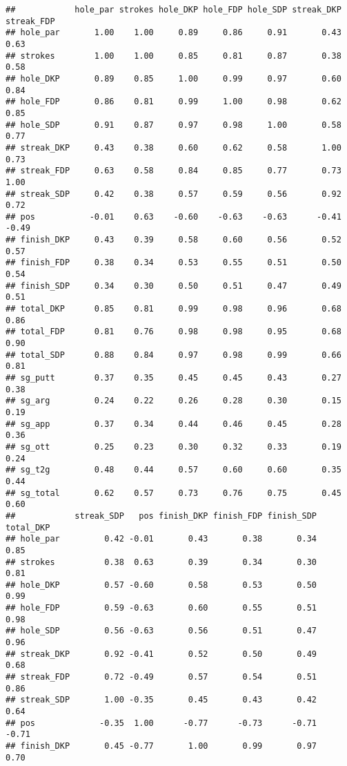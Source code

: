 \documentclass[
]{article}
\begin{document}
\begin{verbatim}
##            hole_par strokes hole_DKP hole_FDP hole_SDP streak_DKP streak_FDP
## hole_par       1.00    1.00     0.89     0.86     0.91       0.43       0.63
## strokes        1.00    1.00     0.85     0.81     0.87       0.38       0.58
## hole_DKP       0.89    0.85     1.00     0.99     0.97       0.60       0.84
## hole_FDP       0.86    0.81     0.99     1.00     0.98       0.62       0.85
## hole_SDP       0.91    0.87     0.97     0.98     1.00       0.58       0.77
## streak_DKP     0.43    0.38     0.60     0.62     0.58       1.00       0.73
## streak_FDP     0.63    0.58     0.84     0.85     0.77       0.73       1.00
## streak_SDP     0.42    0.38     0.57     0.59     0.56       0.92       0.72
## pos           -0.01    0.63    -0.60    -0.63    -0.63      -0.41      -0.49
## finish_DKP     0.43    0.39     0.58     0.60     0.56       0.52       0.57
## finish_FDP     0.38    0.34     0.53     0.55     0.51       0.50       0.54
## finish_SDP     0.34    0.30     0.50     0.51     0.47       0.49       0.51
## total_DKP      0.85    0.81     0.99     0.98     0.96       0.68       0.86
## total_FDP      0.81    0.76     0.98     0.98     0.95       0.68       0.90
## total_SDP      0.88    0.84     0.97     0.98     0.99       0.66       0.81
## sg_putt        0.37    0.35     0.45     0.45     0.43       0.27       0.38
## sg_arg         0.24    0.22     0.26     0.28     0.30       0.15       0.19
## sg_app         0.37    0.34     0.44     0.46     0.45       0.28       0.36
## sg_ott         0.25    0.23     0.30     0.32     0.33       0.19       0.24
## sg_t2g         0.48    0.44     0.57     0.60     0.60       0.35       0.44
## sg_total       0.62    0.57     0.73     0.76     0.75       0.45       0.60
##            streak_SDP   pos finish_DKP finish_FDP finish_SDP total_DKP
## hole_par         0.42 -0.01       0.43       0.38       0.34      0.85
## strokes          0.38  0.63       0.39       0.34       0.30      0.81
## hole_DKP         0.57 -0.60       0.58       0.53       0.50      0.99
## hole_FDP         0.59 -0.63       0.60       0.55       0.51      0.98
## hole_SDP         0.56 -0.63       0.56       0.51       0.47      0.96
## streak_DKP       0.92 -0.41       0.52       0.50       0.49      0.68
## streak_FDP       0.72 -0.49       0.57       0.54       0.51      0.86
## streak_SDP       1.00 -0.35       0.45       0.43       0.42      0.64
## pos             -0.35  1.00      -0.77      -0.73      -0.71     -0.71
## finish_DKP       0.45 -0.77       1.00       0.99       0.97      0.70

\end{verbatim}
\end{document}
